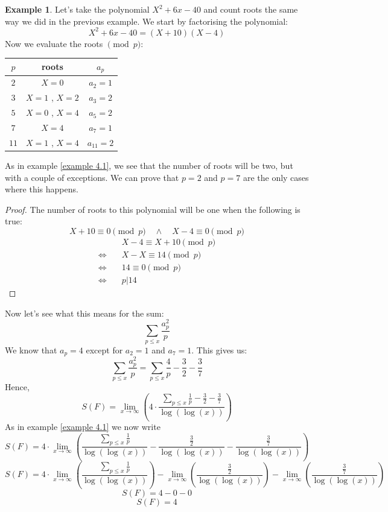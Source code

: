 \documentclass{article}
\theoremstyle{definition}
\newtheorem{example}{Example}[section]
\theoremstyle{remark}
\begin{document}
\begin{example}
Let's take the polynomial $X^2+6x-40$ and count roots the same way we did in the previous example.
We start by factorising the polynomial:
$$X^2+6x-40=(X+10)(X-4)$$
Now we evaluate the roots $\pmod{p}$:
\end{example}
\begin{table}[H]
\centering
\begin{tabular}{c|c|c}
	\hline $p$ & roots & $a_p$ \\
	\hline $2$ & $X=0$ & $a_2=1$ \\
    \hline $3$ & $X=1$ , $X=2$ & $a_3 = 2$ \\
    \hline $5$ & $X=0$ , $X=4$ & $a_5 = 2$ \\
    \hline $7$ & $X=4$ & $a_7 = 1$ \\
    \hline $11$ & $X=1$ , $X=4$ & $a_{11} = 2$
\end{tabular}
\end{table}
As in example \ref{example 4.1}, we see that the number of roots will be two, but with a couple of exceptions.
We can prove that $p=2$ and $p=7$ are the only cases where this happens.
\begin{proof}
The number of roots to this polynomial will be one when the following is true:
$$X+10 \equiv 0 \pmod{p} \quad \wedge \quad X-4 \equiv 0 \pmod{p}$$
\begin{equation}
\begin{split}
& X-4 \equiv X+10 \pmod{p} \\
\Leftrightarrow \quad & X-X \equiv 14 \pmod{p} \\
\Leftrightarrow \quad & 14 \equiv 0 \pmod{p} \\
\Leftrightarrow \quad & p | 14
\end{split}
\end{equation}
\end{proof}

Now let's see what this means for the sum:
$$\sum_{p \leq x}\frac{a_p^2}{p}$$
We know that $a_p=4$ except for $a_2=1$ and $a_7=1$. This gives us:
$$\sum_{p \leq x}\frac{a_p^2}{p}=\sum_{p \leq x}\frac{4}{p}-\frac{3}{2}-\frac{3}{7}$$
Hence,
$$S(F)=\lim_{x \rightarrow \infty}\left(4\cdot \frac{\sum_{p\leq x}\frac{1}{p}-\frac{3}{2}-\frac{3}{7}}{\log(\log(x))}\right)$$
As in example \ref{example 4.1} we now write
$$S(F)=4\cdot \lim_{x \rightarrow \infty}\left(\frac{\sum_{p\leq x}\frac{1}{p}}{\log(\log(x))}-\frac{\frac{3}{2}}{\log(\log(x))}-\frac{\frac{3}{7}}{\log(\log(x))}\right)$$
$$S(F)=4\cdot \lim_{x \rightarrow \infty}\left(\frac{\sum_{p\leq x}\frac{1}{p}}{\log(\log(x))}\right)-\lim_{x \rightarrow \infty}\left(\frac{\frac{3}{2}}{\log(\log(x))}\right)-\lim_{x \rightarrow \infty}\left(\frac{\frac{3}{7}}{\log(\log(x))}\right)$$
$$S(F)=4-0-0$$
$$S(F)=4$$
\end{document}
